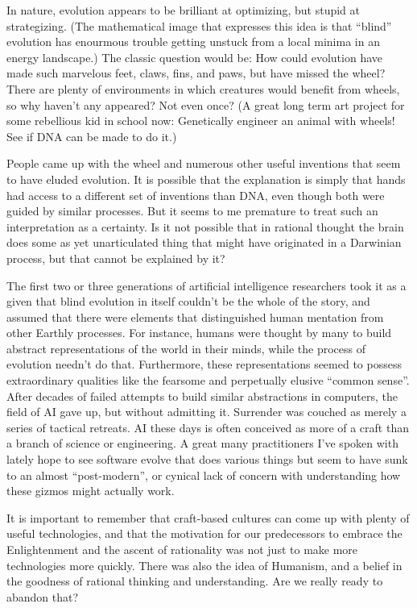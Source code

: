 \documentclass[letterpaper,12pt,english]{sphinxmanual}
\begin{document}
In nature, evolution appears to be brilliant at optimizing, but stupid at strategizing. (The mathematical image that expresses this idea is that ``blind'' evolution has enourmous trouble getting unstuck from a local minima in an energy landscape.) The classic question would be: How could evolution have made such marvelous feet, claws, fins, and paws, but have missed the wheel? There are plenty of environments in which creatures would benefit from wheels, so why haven't any appeared? Not even once? (A great long term art project for some rebellious kid in school now: Genetically engineer an animal with wheels! See if DNA can be made to do it.)

People came up with the wheel and numerous other useful inventions that seem to have eluded evolution. It is possible that the explanation is simply that hands had access to a different set of inventions than DNA, even though both were guided by similar processes. But it seems to me premature to treat such an interpretation as a certainty. Is it not possible that in rational thought the brain does some as yet unarticulated thing that might have originated in a Darwinian process, but that cannot be explained by it?

The first two or three generations of artificial intelligence researchers took it as a given that blind evolution in itself couldn't be the whole of the story, and assumed that there were elements that distinguished human mentation from other Earthly processes. For instance, humans were thought by many to build abstract representations of the world in their minds, while the process of evolution needn't do that. Furthermore, these representations seemed to possess extraordinary qualities like the fearsome and perpetually elusive ``common sense''. After decades of failed attempts to build similar abstractions in computers, the field of AI gave up, but without admitting it. Surrender was couched as merely a series of tactical retreats. AI these days is often conceived as more of a craft than a branch of science or engineering. A great many practitioners I've spoken with lately hope to see software evolve that does various things but seem to have sunk to an almost ``post-modern'', or cynical lack of concern with understanding how these gizmos might actually work.

It is important to remember that craft-based cultures can come up with plenty of useful technologies, and that the motivation for our predecessors to embrace the Enlightenment and the ascent of rationality was not just to make more technologies more quickly. There was also the idea of Humanism, and a belief in the goodness of rational thinking and understanding. Are we really ready to abandon that?
\end{document}
